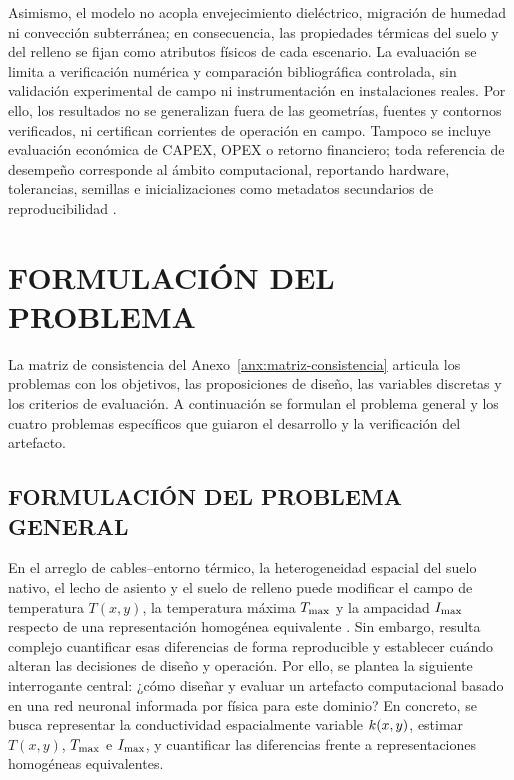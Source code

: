 Asimismo, el modelo no acopla envejecimiento dieléctrico, migración de humedad ni convección subterránea; en consecuencia, las propiedades térmicas del suelo y del relleno se fijan como atributos físicos de cada escenario. La evaluación se limita a verificación numérica y comparación bibliográfica controlada, sin validación experimental de campo ni instrumentación en instalaciones reales. Por ello, los resultados no se generalizan fuera de las geometrías, fuentes y contornos verificados, ni certifican corrientes de operación en campo. Tampoco se incluye evaluación económica de CAPEX, OPEX o retorno financiero; toda referencia de desempeño corresponde al ámbito computacional, reportando hardware, tolerancias, semillas e inicializaciones como metadatos secundarios de reproducibilidad \parencite[350--351]{gregor2013}.

\section{FORMULACIÓN DEL PROBLEMA}
\label{sec:formulacion-problema}

La matriz de consistencia del Anexo~\ref{anx:matriz-consistencia} articula los problemas con los objetivos, las proposiciones de diseño, las variables discretas y los criterios de evaluación. A continuación se formulan el problema general y los cuatro problemas específicos que guiaron el desarrollo y la verificación del artefacto.

\subsection{FORMULACIÓN DEL PROBLEMA GENERAL}

En el arreglo de cables--entorno térmico, la heterogeneidad espacial del suelo nativo, el lecho de asiento y el suelo de relleno puede modificar el campo de temperatura $T(x,y)$, la temperatura máxima $T_{\max}$ y la ampacidad $I_{\max}$ respecto de una representación homogénea equivalente \parencites[4--6]{enescu2021}[3--4,93--99]{cigre2025}. Sin embargo, resulta complejo cuantificar esas diferencias de forma reproducible y establecer cuándo alteran las decisiones de diseño y operación. Por ello, se plantea la siguiente interrogante central: ¿cómo diseñar y evaluar un artefacto computacional basado en una red neuronal informada por física para este dominio? En concreto, se busca representar la conductividad espacialmente variable $k(x,y)$, estimar $T(x,y)$, $T_{\max}$ e $I_{\max}$, y cuantificar las diferencias frente a representaciones homogéneas equivalentes.

